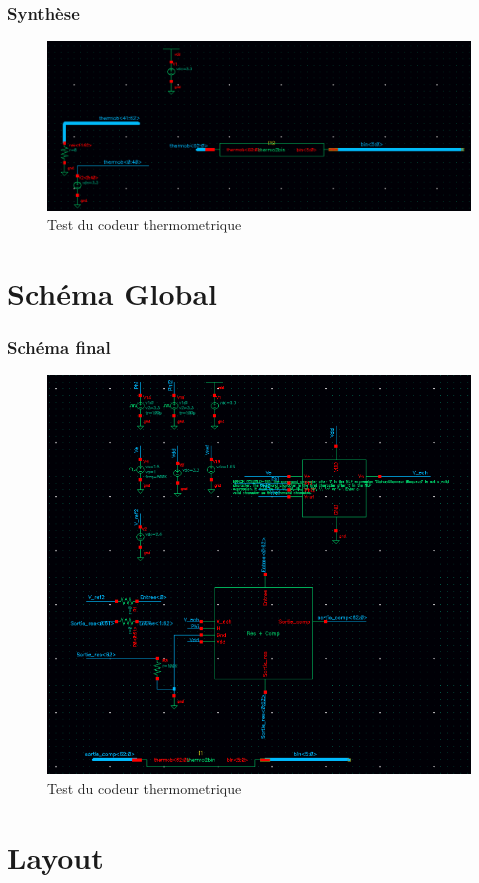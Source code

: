 \documentclass{beamer}
\begin{document}
\begin{frame}
\frametitle{Synth\`ese}

\begin{figure}[!htb]
  \includegraphics[width=0.8\linewidth]{test_thermo2bin.png}
  \caption{Test du codeur thermometrique}
\end{figure}

\end{frame}


\section{Sch\'ema Global}

\begin{frame}
\frametitle{Sch\'ema final}

\begin{figure}[!htb]
  \includegraphics[width=0.6\linewidth]{schema_final.png}
  \caption{Test du codeur thermometrique}
\end{figure}

\end{frame}


\section{Layout}
\end{document}
